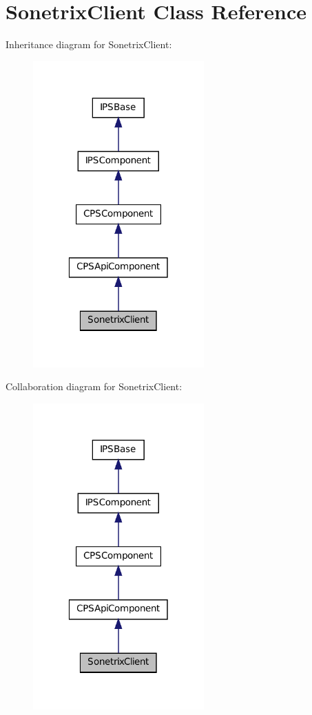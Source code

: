\hypertarget{classSonetrixClient}{
\section{SonetrixClient Class Reference}
\label{classSonetrixClient}
}


Inheritance diagram for SonetrixClient:\nopagebreak
\begin{figure}[H]
\begin{center}
\leavevmode
\includegraphics[width=186pt]{classSonetrixClient__inherit__graph}
\end{center}
\end{figure}


Collaboration diagram for SonetrixClient:\nopagebreak
\begin{figure}[H]
\begin{center}
\leavevmode
\includegraphics[width=186pt]{classSonetrixClient__coll__graph}
\end{center}
\end{figure}
